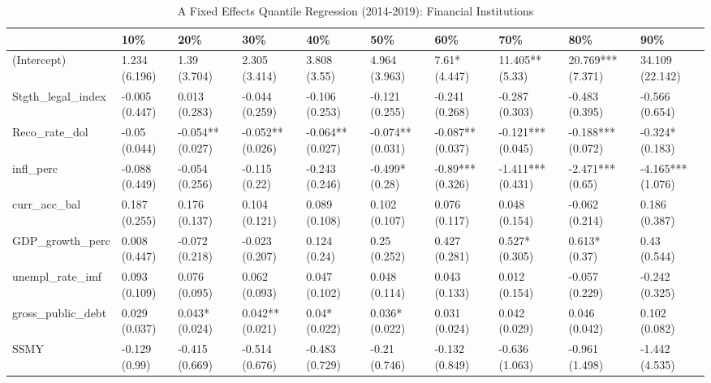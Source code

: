 \begin{table}[ht]
\centering
\caption{A Fixed Effects Quantile Regression (2014-2019): Financial Institutions} 
\begingroup\small
\begin{tabular}{llllllllll}
  \toprule
 & 10\% & 20\% & 30\% & 40\% & 50\% & 60\% & 70\% & 80\% & 90\% \\ 
  \midrule
(Intercept) & 1.234 (6.196) & 1.39 (3.704) & 2.305 (3.414) & 3.808 (3.55) & 4.964 (3.963) & 7.61* (4.447) & 11.405** (5.33) & 20.769*** (7.371) & 34.109 (22.142) \\ 
  Stgth\_legal\_index & -0.005 (0.447) & 0.013 (0.283) & -0.044 (0.259) & -0.106 (0.253) & -0.121 (0.255) & -0.241 (0.268) & -0.287 (0.303) & -0.483 (0.395) & -0.566 (0.654) \\ 
  Reco\_rate\_dol & -0.05 (0.044) & -0.054** (0.027) & -0.052** (0.026) & -0.064** (0.027) & -0.074** (0.031) & -0.087** (0.037) & -0.121*** (0.045) & -0.188*** (0.072) & -0.324* (0.183) \\ 
  infl\_perc & -0.088 (0.449) & -0.054 (0.256) & -0.115 (0.22) & -0.243 (0.246) & -0.499* (0.28) & -0.89*** (0.326) & -1.411*** (0.431) & -2.471*** (0.65) & -4.165*** (1.076) \\ 
  curr\_acc\_bal & 0.187 (0.255) & 0.176 (0.137) & 0.104 (0.121) & 0.089 (0.108) & 0.102 (0.107) & 0.076 (0.117) & 0.048 (0.154) & -0.062 (0.214) & 0.186 (0.387) \\ 
  GDP\_growth\_perc & 0.008 (0.447) & -0.072 (0.218) & -0.023 (0.207) & 0.124 (0.24) & 0.25 (0.252) & 0.427 (0.281) & 0.527* (0.305) & 0.613* (0.37) & 0.43 (0.544) \\ 
  unempl\_rate\_imf & 0.093 (0.109) & 0.076 (0.095) & 0.062 (0.093) & 0.047 (0.102) & 0.048 (0.114) & 0.043 (0.133) & 0.012 (0.154) & -0.057 (0.229) & -0.242 (0.325) \\ 
  gross\_public\_debt & 0.029 (0.037) & 0.043* (0.024) & 0.042** (0.021) & 0.04* (0.022) & 0.036* (0.022) & 0.031 (0.024) & 0.042 (0.029) & 0.046 (0.042) & 0.102 (0.082) \\ 
  SSMY & -0.129 (0.99) & -0.415 (0.669) & -0.514 (0.676) & -0.483 (0.729) & -0.21 (0.746) & -0.132 (0.849) & -0.636 (1.063) & -0.961 (1.498) & -1.442 (4.535) \\ 
   \bottomrule
\end{tabular}
\endgroup
\end{table}

